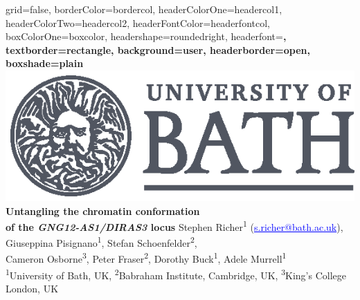 \documentclass[a0paper, portrait]{baposter}
\begin{document}
\begin{poster}{
	grid=false,
	borderColor=bordercol, %
	headerColorOne=headercol1, %
	headerColorTwo=headercol2, %
	headerFontColor=headerfontcol, %
	boxColorOne=boxcolor, %
	headershape=roundedright, %
	headerfont=\Large\sf\bf, %
	textborder=rectangle,
	background=user,
	headerborder=open, %
	boxshade=plain
} 
%
%
{\includegraphics[scale=0.6]{uob-logo.eps}} %
{\sf\bf\huge 
	Untangling the chromatin conformation \\ of the \textit{GNG12-AS1/DIRAS3} locus}
{\vspace{0.5em} \normalsize 
	Stephen Richer\textsuperscript{1} (\textcolor{blue}{\underline{s.richer@bath.ac.uk}}),
	Giuseppina Pisignano\textsuperscript{1}, 
	Stefan Schoenfelder\textsuperscript{2}, 
	\\ 
	Cameron Osborne\textsuperscript{3}, 
	Peter Fraser\textsuperscript{2}, 
	Dorothy Buck\textsuperscript{1}, 
	Adele Murrell\textsuperscript{1} \\ 
{\vspace{0.5em} 
	\textsuperscript{1}University of Bath, UK,
	\textsuperscript{2}Babraham Institute, Cambridge, UK,
	\textsuperscript{3}King's College London, UK}} 

\end{poster}
\end{document}
